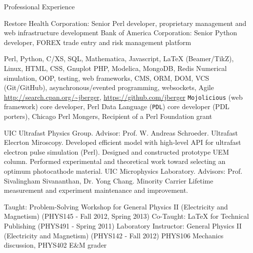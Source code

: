 \begin{rubric}{Professional Experience}


   Restore Health Corporation: Senior Perl developer, proprietary management and web infrastructure development
   Bank of America Corporation: Senior Python developer, FOREX trade entry and risk management platform


  \entry*[Proficient in] Perl, Python, C/XS, SQL, Mathematica, Javascript, \LaTeX{} (Beamer/TikZ), Linux, HTML, CSS, Gnuplot
   PHP, Modelica, MongoDB, Redis
  \entry*[Concepts] Numerical simulation, OOP, testing, web frameworks, CMS, ORM, DOM, VCS (Git/GitHub), asynchronous/evented programming, websockets, Agile
  \entry*[Code] \url{http://search.cpan.org/~jberger}, \url{https://github.com/jberger}
  \entry*[Affiliations] \texttt{Mojolicious} (web framework) core developer, Perl Data Language (\texttt{PDL}) core developer (PDL porters), Chicago Perl Mongers, Recipient of a Perl Foundation grant


  \entry*[2005 --- 2013] UIC Ultrafast Physics Group. Advisor: Prof. W. Andreas Schroeder. Ultrafast Elecrton Miroscopy.
  \entry* Developed efficient model with high-level API for ultrafast electron pulse simulation (Perl).
  \entry* Designed and constructed prototype UEM column.
  \entry* Performed experimental and theoretical work toward selecting an optimum photocathode material.
  \entry*[2003 --- 2005] UIC Microphysics Laboratory. Advisors: Prof. Sivalingham Sivananthan, Dr. Yong Chang.
  \entry* Minority Carrier Lifetime measurement and experiment maintenance and improvement.


  \entry*[Teaching] Taught: Problem-Solving Workshop for General Physics II (Electricity and Magnetism) (PHYS145 - Fall 2012, Spring 2013)
  \entry*[Teaching] Co-Taught: \LaTeX{} for Technical Publishing (PHYS491 - Spring 2011)
  \entry*[T.A.] Laboratory Instructor: General Physics II (Electricity and Magnetism) (PHYS142 - Fall 2012)
  \entry*[T.A.] PHYS106 Mechanics discussion, PHYS402 E\&M grader

\end{rubric}
